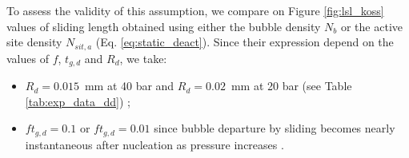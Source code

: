 \npar

To assess the validity of this assumption, we compare on Figure \ref{fig:lsl_koss} values of sliding length obtained using either the bubble density $N_{b}$ or the active site density $N_{sit,a}$ (Eq. \ref{eq:static_deact}). Since their expression depend on the values of $f$, $t_{g,d}$ and $R_{d}$, we take:
\begin{itemize}
\item $R_{d} = 0.015$~mm at 40 bar and $R_{d} = 0.02$~mm at 20 bar (see Table \ref{tab:exp_data_dd}) ;
\item $ft_{g,d}=0.1$ or $ft_{g,d}=0.01$ since bubble departure by sliding becomes nearly instantaneous after nucleation as pressure increases \cite{kossolapov_experimental_2021}.
\end{itemize}

